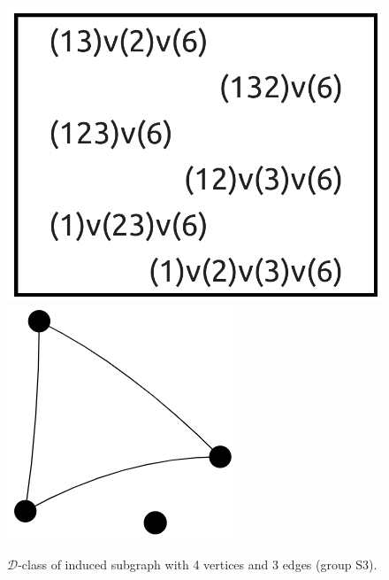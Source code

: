 \begin{appendices}
\begin{figure}[H]
\includegraphics[scale=0.08]{images/x1/x1_4v_3e.png}
\includegraphics[scale=0.2]{images/x1/x1_4v_3e_1_vis.png}
\caption{$\mathcal{D}$-class of induced subgraph with 4 vertices and 3 edges (group S3).}
\end{figure}


\end{appendices}
